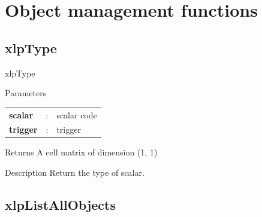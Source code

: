 \section{Object management functions}


\subsection{xlpType}

\begin{xlpfunctitle}{xlpType}

\begin{xlpfunc}{Parameters}
\begin{tabular}{p{3.5cm}cl}
\textbf{scalar}& : & scalar code \\
\textbf{trigger}& : & trigger 
\end{tabular}
\end{xlpfunc}


\begin{xlpfunc}{Returns}
A cell matrix of dimension (1, 1)
\end{xlpfunc}

\begin{xlpfunc}{Description}
Return the type of scalar. 
\end{xlpfunc}
\end{xlpfunctitle}


\subsection{xlpListAllObjects}

